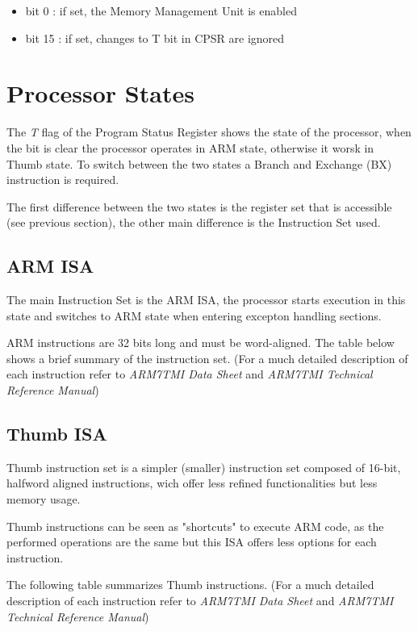 \begin{itemize}
\item bit 0 : if set, the Memory Management Unit is enabled
\item bit 15 : if set, changes to T bit in CPSR are ignored
\end{itemize}

\section{Processor States}

The \emph{T} flag of the Program Status Register shows the state of the processor, when the bit is clear the processor operates in ARM state, otherwise it worsk in Thumb state. To switch between the two states a Branch and Exchange (BX) instruction is required.

The first difference between the two states is the register set that is accessible (see previous section), the other main difference is the Instruction Set used.

\subsection{ARM ISA}

The main Instruction Set is the ARM ISA, the processor starts execution in this state and switches to ARM state when entering excepton handling sections.

ARM instructions are 32 bits long and must be word-aligned. The table below shows a brief summary of the instruction set. (For a much detailed description of each instruction refer to \emph{ARM7TMI Data Sheet} and \emph{ARM7TMI Technical Reference Manual})



\subsection{Thumb ISA}

Thumb instruction set is a simpler (smaller) instruction set composed of 16-bit, halfword aligned instructions, wich offer less refined functionalities but less memory usage.

Thumb instructions can be seen as "shortcuts" to execute ARM code, as the performed operations are the same but this ISA offers less options for each instruction.

The following table summarizes Thumb instructions. (For a much detailed description of each instruction refer to \emph{ARM7TMI Data Sheet} and \emph{ARM7TMI Technical Reference Manual})

